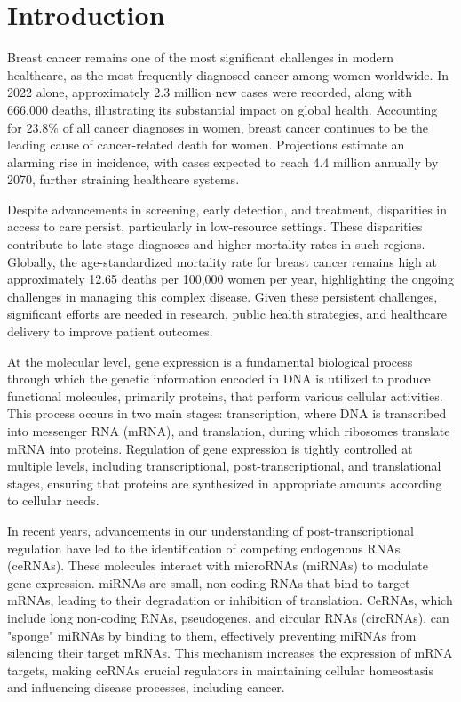 \chapter{Introduction}

Breast cancer remains one of the most significant challenges in modern
healthcare, as the most frequently diagnosed cancer among women worldwide.
In 2022 alone, approximately 2.3 million new cases were recorded, along with
666,000 deaths, illustrating its substantial impact on global health.
Accounting for 23.8\% of all cancer diagnoses in
women\supercite{bray_global_2024,ferlay_global_2024}, breast cancer continues
to be the leading cause of cancer-related death for women.
Projections estimate an alarming rise in incidence, with cases expected to
reach 4.4 million annually by 2070, further straining healthcare
systems\supercite{lei_global_2021}.

Despite advancements in screening, early detection, and treatment, disparities
in access to care persist, particularly in low-resource settings.
These disparities contribute to late-stage diagnoses and higher mortality rates
in such regions\supercite{wilkinson_understanding_2022,ginsburg_breast_2020}.
Globally, the age-standardized mortality rate for breast cancer remains high at
approximately 12.65 deaths per 100,000 women per year, highlighting the ongoing
challenges in managing this complex
disease\supercite{bray_global_2024,ferlay_global_2024}.
Given these persistent challenges, significant efforts are needed in research,
public health strategies, and healthcare delivery to improve patient
outcomes\supercite{desantis_breast_2019}.

At the molecular level, gene expression is a fundamental biological process
through which the genetic information encoded in DNA is utilized to produce
functional molecules, primarily proteins, that perform various cellular
activities.
This process occurs in two main stages: transcription, where DNA is transcribed
into messenger RNA (mRNA), and translation, during which ribosomes translate
mRNA into proteins.
Regulation of gene expression is tightly controlled at multiple levels,
including transcriptional, post-transcriptional, and translational stages,
ensuring that proteins are synthesized in appropriate amounts according to
cellular needs.

In recent years, advancements in our understanding of post-transcriptional
regulation have led to the identification of competing endogenous RNAs
(ceRNAs).
These molecules interact with microRNAs (miRNAs) to modulate gene expression.
miRNAs are small, non-coding RNAs that bind to target mRNAs,
leading to their degradation or inhibition of translation.
CeRNAs, which include long non-coding RNAs, pseudogenes, and circular RNAs
(circRNAs), can "sponge" miRNAs by binding to them, effectively preventing
miRNAs from silencing their target mRNAs.
This mechanism increases the expression of mRNA targets, making ceRNAs crucial
regulators in maintaining cellular homeostasis and influencing disease
processes, including cancer.

